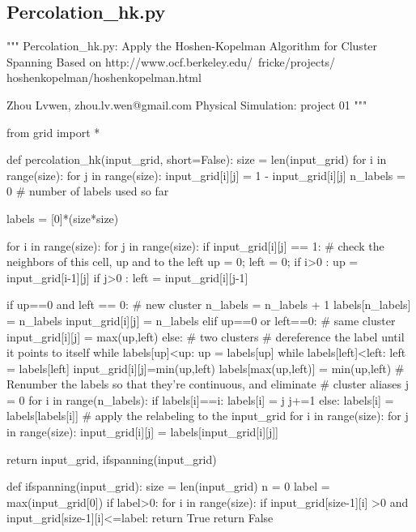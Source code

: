 \documentclass[11pt,a4paper,boxed]{caspset}
\begin{document}
\begin{subappendices}
\section{Percolation\_hk.py}
\begin{python}
"""
Percolation_hk.py: Apply the Hoshen-Kopelman Algorithm for Cluster Spanning
Based on http://www.ocf.berkeley.edu/~fricke/projects/
                hoshenkopelman/hoshenkopelman.html

Zhou Lvwen, zhou.lv.wen@gmail.com
Physical Simulation: project 01
"""

from grid import *

def percolation_hk(input_grid, short=False):
    size = len(input_grid)
    for i in range(size):
        for j in range(size):
            input_grid[i][j] = 1 - input_grid[i][j]
    n_labels = 0 # number of labels used so far

    labels = [0]*(size*size)

    for i in range(size):
        for j in range(size):
            if input_grid[i][j] == 1:
               # check the neighbors of this cell, up and to the left
               up = 0;
               left = 0;
               if i>0 :
                  up = input_grid[i-1][j]
               if j>0 :
                  left = input_grid[i][j-1]

               if up==0 and left == 0: # new cluster
                  n_labels  = n_labels + 1
                  labels[n_labels] = n_labels
                  input_grid[i][j] = n_labels
               elif up==0 or left==0: # same cluster
                  input_grid[i][j] = max(up,left)
               else: # two clusters
                   # dereference the label until it points to itself
                   while labels[up]<up:
                       up = labels[up]
                   while labels[left]<left:
                       left = labels[left]
                   input_grid[i][j]=min(up,left)
                   labels[max(up,left)] = min(up,left)
    # Renumber the labels so that they're continuous, and eliminate
    # cluster aliases
    j = 0
    for i in range(n_labels):
        if labels[i]==i:
           labels[i] = j
           j+=1
        else:
           labels[i] = labels[labels[i]]
    # apply the relabeling to the input_grid
    for i in range(size):
        for j in range(size):
            input_grid[i][j] = labels[input_grid[i][j]]

    return input_grid, ifspanning(input_grid)

def ifspanning(input_grid):
    size = len(input_grid)
    n = 0
    label = max(input_grid[0])
    if label>0:
       for i in range(size):
            if input_grid[size-1][i] >0 and input_grid[size-1][i]<=label:
               return True
    return False
\end{python}


\end{subappendices}
\end{document}
